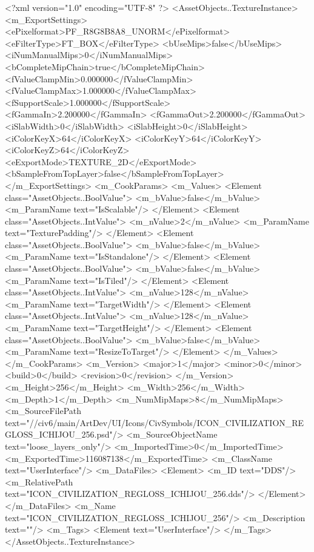 <?xml version="1.0" encoding="UTF-8" ?>
<AssetObjects..TextureInstance>
	<m_ExportSettings>
		<ePixelformat>PF_R8G8B8A8_UNORM</ePixelformat>
		<eFilterType>FT_BOX</eFilterType>
		<bUseMips>false</bUseMips>
		<iNumManualMips>0</iNumManualMips>
		<bCompleteMipChain>true</bCompleteMipChain>
		<fValueClampMin>0.000000</fValueClampMin>
		<fValueClampMax>1.000000</fValueClampMax>
		<fSupportScale>1.000000</fSupportScale>
		<fGammaIn>2.200000</fGammaIn>
		<fGammaOut>2.200000</fGammaOut>
		<iSlabWidth>0</iSlabWidth>
		<iSlabHeight>0</iSlabHeight>
		<iColorKeyX>64</iColorKeyX>
		<iColorKeyY>64</iColorKeyY>
		<iColorKeyZ>64</iColorKeyZ>
		<eExportMode>TEXTURE_2D</eExportMode>
		<bSampleFromTopLayer>false</bSampleFromTopLayer>
	</m_ExportSettings>
	<m_CookParams>
		<m_Values>
			<Element class="AssetObjects..BoolValue">
				<m_bValue>false</m_bValue>
				<m_ParamName text="IsScalable"/>
			</Element>
			<Element class="AssetObjects..IntValue">
				<m_nValue>2</m_nValue>
				<m_ParamName text="TexturePadding"/>
			</Element>
			<Element class="AssetObjects..BoolValue">
				<m_bValue>false</m_bValue>
				<m_ParamName text="IsStandalone"/>
			</Element>
			<Element class="AssetObjects..BoolValue">
				<m_bValue>false</m_bValue>
				<m_ParamName text="IsTiled"/>
			</Element>
			<Element class="AssetObjects..IntValue">
				<m_nValue>128</m_nValue>
				<m_ParamName text="TargetWidth"/>
			</Element>
			<Element class="AssetObjects..IntValue">
				<m_nValue>128</m_nValue>
				<m_ParamName text="TargetHeight"/>
			</Element>
			<Element class="AssetObjects..BoolValue">
				<m_bValue>false</m_bValue>
				<m_ParamName text="ResizeToTarget"/>
			</Element>
		</m_Values>
	</m_CookParams>
	<m_Version>
		<major>1</major>
		<minor>0</minor>
		<build>0</build>
		<revision>0</revision>
	</m_Version>
	<m_Height>256</m_Height>
	<m_Width>256</m_Width>
	<m_Depth>1</m_Depth>
	<m_NumMipMaps>8</m_NumMipMaps>
	<m_SourceFilePath text="//civ6/main/ArtDev/UI/Icons/CivSymbols/ICON_CIVILIZATION_REGLOSS_ICHIJOU_256.psd"/>
	<m_SourceObjectName text="loose_layers_only"/>
	<m_ImportedTime>0</m_ImportedTime>
	<m_ExportedTime>116087138</m_ExportedTime>
	<m_ClassName text="UserInterface"/>
	<m_DataFiles>
		<Element>
			<m_ID text="DDS"/>
			<m_RelativePath text="ICON_CIVILIZATION_REGLOSS_ICHIJOU_256.dds"/>
		</Element>
	</m_DataFiles>
	<m_Name text="ICON_CIVILIZATION_REGLOSS_ICHIJOU_256"/>
	<m_Description text=""/>
	<m_Tags>
		<Element text="UserInterface"/>
	</m_Tags>
</AssetObjects..TextureInstance>

